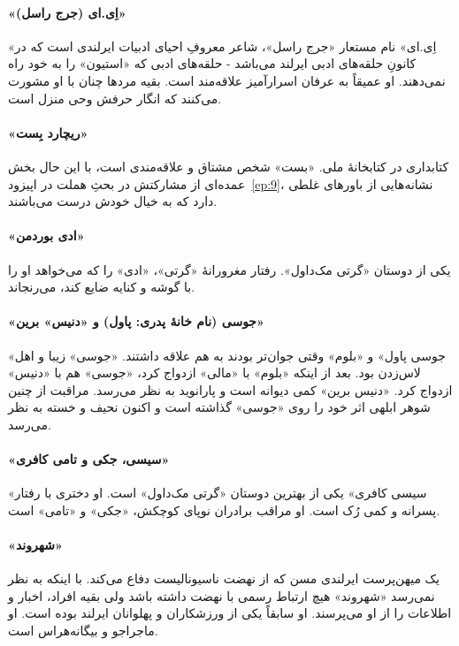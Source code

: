 \documentclass[12pt]{book}
\newcommand{\noun}[1]{«{#1}»}
\begin{document}
    \paragraph{\noun{اِی.ای (جرج راسل)}\protect{}}
    \noun{اِی.ای} نام مستعار \noun{جرج راسل‬}، شاعر معروفِ احیای ادبیات ایرلندی است که در کانونِ حلقه‌های ادبی ایرلند می‌باشد - حلقه‌های ادبی که \noun{استیون} را به خود راه نمی‌دهند. او عمیقاً به عرفان اسرارآمیز علاقه‌مند است. بقیه مردها چنان با او مشورت می‌کنند که انگار حرفش وحی منزل است.
    \paragraph{\noun{ریچارد بِست}\protect{}}
    کتابداری در کتابخانۀ ملی. \noun{بست} شخص مشتاق و علاقه‌مندی است، با این حال بخش عمده‌ای از مشارکتش در بحثِ هملت در اپیزود~\ref{ep:9}، نشانه‌هایی از باورهای غلطی دارد که به خیال خودش درست می‌باشند.
    \paragraph{\noun{ادی بوردمن}\protect{}}
    یکی از دوستان \noun{گرتی مک‌داول‬}. رفتار مغرورانۀ \noun{گرتی}، \noun{ادی} را که می‌خواهد او را با گوشه و کنایه ضایع کند، می‌رنجاند.
    \paragraph{\noun{جوسی (نام خانۀ پدری: پاول) و \noun{دنیس} برین}\protect{}}
    \noun{جوسی پاول} و \noun{بلوم} وقتی جوان‌تر بودند به هم علاقه داشتند. \noun{جوسی} زیبا و اهل لاس‌زدن بود. بعد از اینکه \noun{بلوم} با \noun{مالی} ازدواج کرد، \noun{جوسی} هم با \noun{دنیس} ازدواج کرد. \noun{دنیس برین} کمی دیوانه است و پارانوید به نظر می‌رسد. مراقبت از چنین شوهر ابلهی اثر خود را روی \noun{جوسی} گذاشته است و اکنون نحیف و خسته به نظر می‌رسد.
    \paragraph{\noun{سیسی، جکی و تامی کافری}\protect{}}
    \noun{سیسی کافری} یکی از بهترین دوستان \noun{گرتی مک‌داول‬} است. او دختری با رفتار پسرانه و کمی رُک است. او مراقب برادران نوپای کوچکش، \noun{جکی} و \noun{تامی} است.
    \paragraph{\noun{شهروند}\protect{}}
    یک میهن‌پرست ایرلندی مسن که از نهضت ناسیونالیست دفاع می‌کند. با اینکه به نظر نمی‌رسد \noun{شهروند‬} هیچ ارتباط رسمی با نهضت داشته باشد ولی بقیه افراد، اخبار و اطلاعات را از او می‌پرسند. او سابقاً یکی از ورزشکاران و پهلوانان ایرلند بوده است. او ماجراجو و بیگانه‌هراس است.
\end{document}
